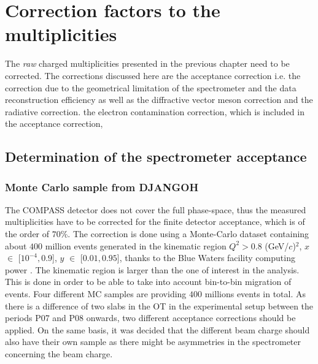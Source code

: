 
\chapter{Correction factors to the multiplicities} %

\label{ch:CF} %


The \textit{raw} charged multiplicities presented in the previous chapter need to be corrected. The corrections discussed here are the acceptance correction i.e. the correction due to the geometrical limitation of the spectrometer and the data reconstruction efficiency as well as the diffractive vector meson correction and the radiative correction. the electron contamination correction, which is included in the acceptance correction,

\section{Determination of the spectrometer acceptance} \label{sec:Acc}

\subsection{Monte Carlo sample from DJANGOH}

The COMPASS detector does not cover the full phase-space, thus the measured multiplicities have
to be corrected for the finite detector acceptance, which is of the order of $70$\%. The correction is
done using a Monte-Carlo dataset containing about $400$ million events generated in the kinematic
region $Q^2 > 0.8$ (GeV/$c$)$^2$, $x$ $\in$ [$10^{-4},0.9$], $y$ $\in$ [$0.01,0.95$], thanks to the Blue Waters facility computing power \cite{Bode2013,Kramer2015}. The kinematic region is larger than the one of interest in the analysis. This is done in order to be able to take into account bin-to-bin migration of events. Four different MC samples are providing $400$ millions events in total. As there is a difference of two slabs in the OT in the experimental setup between the periods P07 and P08 onwards, two different acceptance corrections should be applied. On the same basis, it was decided that the different beam charge should also have their own sample as there might be asymmetries in the spectrometer concerning the beam charge.

